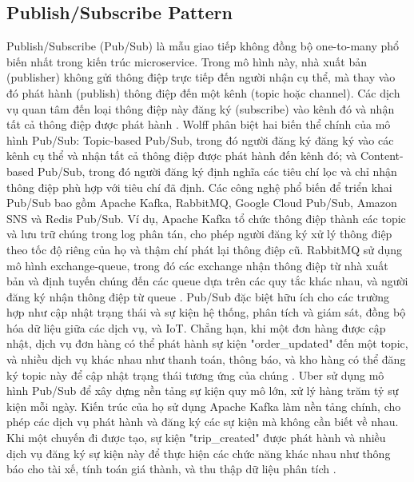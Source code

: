 \subsection{Publish/Subscribe Pattern}
Publish/Subscribe (Pub/Sub) là mẫu giao tiếp không đồng bộ one-to-many phổ biến nhất trong kiến trúc microservice. Trong mô hình này, nhà xuất bản (publisher) không gửi thông điệp trực tiếp đến người nhận cụ thể, mà thay vào đó phát hành (publish) thông điệp đến một kênh (topic hoặc channel). Các dịch vụ quan tâm đến loại thông điệp này đăng ký (subscribe) vào kênh đó và nhận tất cả thông điệp được phát hành \cite{hohpe2004}.
Wolff \cite{wolff2016} phân biệt hai biến thể chính của mô hình Pub/Sub: Topic-based Pub/Sub, trong đó người đăng ký đăng ký vào các kênh cụ thể và nhận tất cả thông điệp được phát hành đến kênh đó; và Content-based Pub/Sub, trong đó người đăng ký định nghĩa các tiêu chí lọc và chỉ nhận thông điệp phù hợp với tiêu chí đã định.
Các công nghệ phổ biến để triển khai Pub/Sub bao gồm Apache Kafka, RabbitMQ, Google Cloud Pub/Sub, Amazon SNS và Redis Pub/Sub. Ví dụ, Apache Kafka tổ chức thông điệp thành các topic và lưu trữ chúng trong log phân tán, cho phép người đăng ký xử lý thông điệp theo tốc độ riêng của họ và thậm chí phát lại thông điệp cũ. RabbitMQ sử dụng mô hình exchange-queue, trong đó các exchange nhận thông điệp từ nhà xuất bản và định tuyến chúng đến các queue dựa trên các quy tắc khác nhau, và người đăng ký nhận thông điệp từ queue \cite{jun2018}.
Pub/Sub đặc biệt hữu ích cho các trường hợp như cập nhật trạng thái và sự kiện hệ thống, phân tích và giám sát, đồng bộ hóa dữ liệu giữa các dịch vụ, và IoT. Chẳng hạn, khi một đơn hàng được cập nhật, dịch vụ đơn hàng có thể phát hành sự kiện "order\_updated" đến một topic, và nhiều dịch vụ khác nhau như thanh toán, thông báo, và kho hàng có thể đăng ký topic này để cập nhật trạng thái tương ứng của chúng \cite{newman2015}.
Uber sử dụng mô hình Pub/Sub để xây dựng nền tảng sự kiện quy mô lớn, xử lý hàng trăm tỷ sự kiện mỗi ngày. Kiến trúc của họ sử dụng Apache Kafka làm nền tảng chính, cho phép các dịch vụ phát hành và đăng ký các sự kiện mà không cần biết về nhau. Khi một chuyến đi được tạo, sự kiện "trip\_created" được phát hành và nhiều dịch vụ đăng ký sự kiện này để thực hiện các chức năng khác nhau như thông báo cho tài xế, tính toán giá thành, và thu thập dữ liệu phân tích \cite{beyer2018}.

